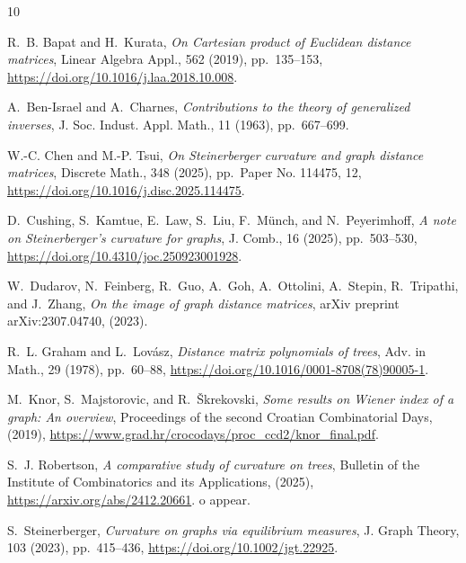 \documentclass[11pt,a4paper]{article}
\begin{document}
    \begin{thebibliography}{10}
        
        {\sc R.~B. Bapat and H.~Kurata}, {\em On {C}artesian product of {E}uclidean distance matrices}, Linear Algebra Appl., 562 (2019), pp.~135--153, \url{https://doi.org/10.1016/j.laa.2018.10.008}.
        
        {\sc A.~Ben-Israel and A.~Charnes}, {\em Contributions to the theory of generalized inverses}, J. Soc. Indust. Appl. Math., 11 (1963), pp.~667--699.
        
        {\sc W.-C. Chen and M.-P. Tsui}, {\em On {S}teinerberger curvature and graph distance matrices}, Discrete Math., 348 (2025), pp.~Paper No. 114475, 12, \url{https://doi.org/10.1016/j.disc.2025.114475}.
        
        {\sc D.~Cushing, S.~Kamtue, E.~Law, S.~Liu, F.~M\"unch, and N.~Peyerimhoff}, {\em A note on {S}teinerberger's curvature for graphs}, J. Comb., 16 (2025), pp.~503--530, \url{https://doi.org/10.4310/joc.250923001928}.
        
        {\sc W.~Dudarov, N.~Feinberg, R.~Guo, A.~Goh, A.~Ottolini, A.~Stepin, R.~Tripathi, and J.~Zhang}, {\em On the image of graph distance matrices}, arXiv preprint arXiv:2307.04740,  (2023).
        
        {\sc R.~L. Graham and L.~Lov\'asz}, {\em Distance matrix polynomials of trees}, Adv. in Math., 29 (1978), pp.~60--88, \url{https://doi.org/10.1016/0001-8708(78)90005-1}.
        
        {\sc M.~Knor, S.~Majstorovic, and R.~{\v{S}}krekovski}, {\em Some results on {W}iener index of a graph: {A}n overview}, Proceedings of the second Croatian Combinatorial Days,  (2019), \url{https://www.grad.hr/crocodays/proc_ccd2/knor_final.pdf}.
        
        {\sc S.~J. Robertson}, {\em A comparative study of curvature on trees}, Bulletin of the Institute of Combinatorics and its Applications,  (2025), \url{https://arxiv.org/abs/2412.20661}.
        o appear.
        
        {\sc S.~Steinerberger}, {\em Curvature on graphs via equilibrium measures}, J. Graph Theory, 103 (2023), pp.~415--436, \url{https://doi.org/10.1002/jgt.22925}.
        

\end{thebibliography}
\end{document}
